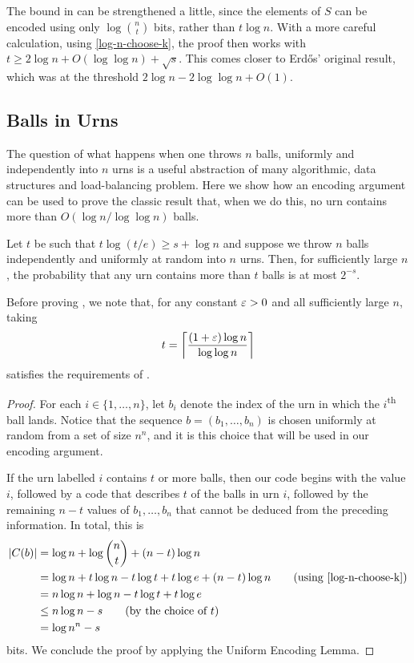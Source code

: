 \documentclass{patmorin}
\begin{document}
\begin{rem}
  The bound in  can be strengthened a little,
  since the elements of $S$ can be encoded using only
  $\log\binom{n}{t}$ bits, rather than $t\log n$.  With a more careful
  calculation, using \eqref{log-n-choose-k}, the proof then works with
  $t \ge 2\log n +O(\log\log n) + \sqrt{s}$. This comes closer to
  Erdős' original result, which was at the threshold $2\log n -
  2\log\log n + O(1)$.
\end{rem}



\subsection{Balls in Urns}

The question of what happens when one throws $n$ balls, uniformly and
independently into $n$ urns is a useful abstraction of many
algorithmic, data structures and load-balancing problem.  Here we show
how an encoding argument can be used to prove the classic result that,
when we do this, no urn contains more than $O(\log n/\log\log n)$
balls.

\begin{thm}
  Let $t$ be such that $t\log(t/e) \ge s+\log n$ and suppose we throw
  $n$ balls independently and uniformly at random into $n$ urns. Then,
  for sufficiently large $n$, the probability that any urn contains
  more than $t$ balls is at most $2^{-s}$.
\end{thm}

Before proving , we note that, for any constant $\varepsilon >0$
and all sufficiently large $n$, taking
\[
  t = {\left\lceil \frac{(1+\varepsilon)\log n}{\log\log n} \right\rceil}
\] 
satisfies the requirements of .

\begin{proof}
  For each $i\in\{1,\ldots,n\}$, let $b_i$ denote the index of the urn
  in which the $i$\textsuperscript{th} ball lands. Notice that the
  sequence $b = (b_1,\ldots,b_n)$ is chosen uniformly at random from a
  set of size $n^n$, and it is this choice that will be used in our
  encoding argument.

  If the urn labelled $i$ contains $t$ or more balls, then our code
  begins with the value $i$, followed by a code that describes $t$ of
  the balls in urn $i$, followed by the remaining $n-t$ values of
  $b_1,\ldots,b_n$ that cannot be deduced from the preceding
  information.  In total, this is
  \begin{align*}
    |C(b)| &= \log n + \log\binom{n}{t} + (n-t)\log n \\
           &= \log n + t\log n - t\log t + t\log e + (n-t)\log n
             \tag{using \eqref{log-n-choose-k}} \\
           & = n \log n + \log n - t\log t + t\log e \\
           & \le  n\log n - s \tag{by the choice of $t$} \\
           & = \log n^n - s
  \end{align*}
  bits. We conclude the proof by applying the Uniform Encoding Lemma.
\end{proof}
\end{document}
